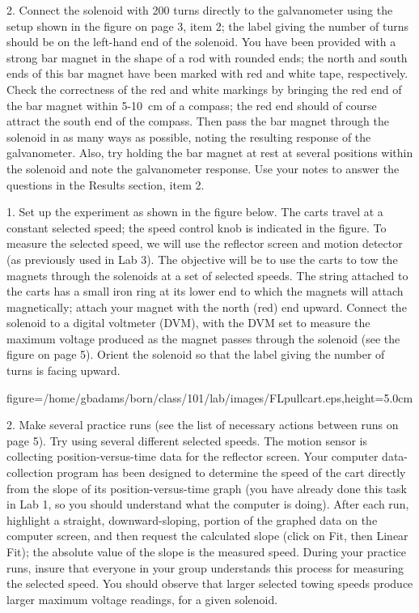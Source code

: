 \item{2.} Connect the solenoid with 200 turns directly to
the galvanometer using the setup shown in the figure on page 3,
item 2; the label giving the number of turns should be on
the left-hand end of the solenoid.  You have been provided with
a strong bar magnet in the shape of a rod with rounded ends; the
north and south ends of this bar magnet have been marked with red
and white tape, respectively.  Check the correctness of the red
and white markings by bringing the red end of the bar magnet
within 5-10~cm of a compass; the red end should of course attract
the south end of the compass.  Then pass the bar magnet through
the solenoid in as many ways as possible, noting the resulting
response of the galvanometer.  Also, try holding the bar magnet
at rest at several positions within the solenoid and note the
galvanometer response.  Use your notes to answer the 
questions in the Results section, item 2.

\bigskip
{}

\item{1.} Set up the experiment as shown in the figure below.
The carts travel at a constant selected speed; the speed
control knob is indicated in the figure.  To measure the
selected speed, we will use the reflector screen and motion
detector (as previously used in Lab 3).  The objective will
be to use the carts to tow the magnets through the solenoids at
a set of selected speeds.  The string attached to the carts
has a small iron ring at its lower end to which the magnets
will attach magnetically; attach your magnet with the north
(red) end upward.  Connect the solenoid to a digital voltmeter
(DVM), with the DVM set to measure the maximum voltage
produced as the magnet passes through the solenoid (see the
figure on page 5).  Orient the solenoid so that the label
giving the number of turns is facing upward.
\smallskip
\smallskip
\centerline{\psfig
{figure=/home/gbadams/born/class/101/lab/images/FLpullcart.eps,height=5.0cm}}
\smallskip
\smallskip

\item{2.} Make several practice runs (see the list of necessary actions
between runs on page 5). Try using several different
selected speeds.  The motion sensor is collecting position-versus-time
data for the reflector screen.  Your computer data-collection program
has been designed to determine the speed of the cart directly from
the slope of its position-versus-time graph (you have already done this
task in Lab 1, so you should understand what the computer is doing).
After each run, highlight a straight, downward-sloping, portion
of the graphed data on the computer screen, and then request the calculated
slope (click on Fit, then Linear Fit); the absolute value of the slope is
the measured speed.  During your practice runs, insure that everyone in your
group understands this process for measuring the selected speed.  You should
observe that larger selected towing speeds produce larger maximum voltage
readings, for a given solenoid.

